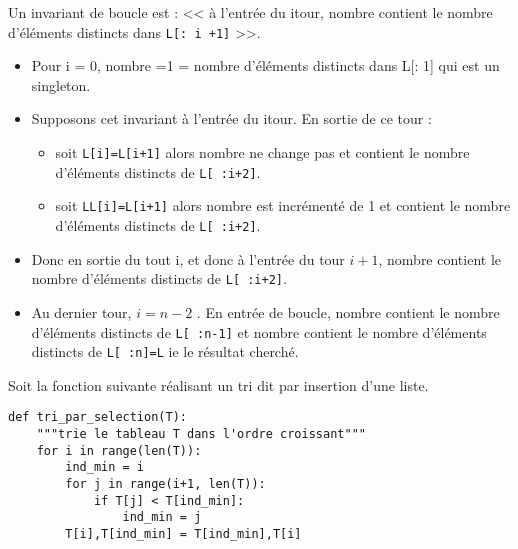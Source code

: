 \begin{multicols}{2}



\ifprof
\begin{corrige}
Un invariant de boucle est :  << à l’entrée du i\ieme tour, nombre contient le nombre d’éléments distincts dans \texttt{L[: i +1]} >>.
\begin{itemize}
\item Pour i = 0, nombre =1 = nombre d’éléments distincts dans L[: 1] qui est un singleton.
\item Supposons cet invariant à l’entrée du i\ieme tour. En sortie de ce tour :
\begin{itemize}
\item soit \texttt{L[i]=L[i+1]} alors nombre ne change pas et contient le nombre d’éléments distincts de \texttt{L[ :i+2]}.
\item soit \texttt{LL[i]=L[i+1]} alors nombre est incrémenté de 1 et contient le nombre d’éléments distincts de \texttt{L[ :i+2]}.
\end{itemize}
\item Donc en sortie du tout i, et donc à l’entrée du tour $i +1$, nombre contient le nombre d’éléments distincts de \texttt{L[ :i+2]}.
\item Au dernier tour, $i = n - 2$ . En entrée de boucle, nombre contient le nombre d’éléments distincts de \texttt{L[ :n-1]} et
nombre contient le nombre d’éléments distincts de \texttt{L[ :n]=L} ie le résultat cherché.
\end{itemize}
\end{corrige}
\else
\fi


\exer{}
\setcounter{numques}{0}

Soit la fonction suivante réalisant un tri dit par insertion d'une liste. 
\begin{lstlisting}
def tri_par_selection(T):
    """trie le tableau T dans l'ordre croissant"""
    for i in range(len(T)):
        ind_min = i
        for j in range(i+1, len(T)):
            if T[j] < T[ind_min]:
                ind_min = j
        T[i],T[ind_min] = T[ind_min],T[i]
\end{lstlisting}


\end{multicols}
